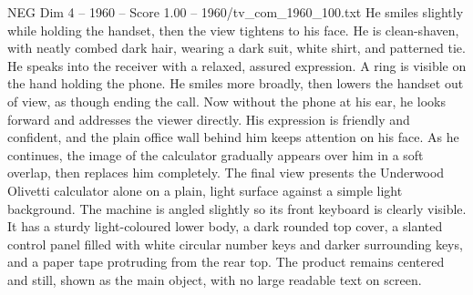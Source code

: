 \begin{textsample}{NEG Dim 4 – 1960 – Score 1.00 – 1960/tv\_com\_1960\_100.txt}
He smiles slightly while holding the handset, then the view tightens to his face.
He is clean-shaven, with neatly combed dark hair, wearing a dark suit, white shirt, and patterned tie.
He speaks into the receiver with a relaxed, assured expression.
A ring is visible on the hand holding the phone.
He smiles more broadly, then lowers the handset out of view, as though ending the call.
Now without the phone at his ear, he looks forward and addresses the viewer directly.
His expression is friendly and confident, and the plain office wall behind him keeps attention on his face.
As he continues, the image of the calculator gradually appears over him in a soft overlap, then replaces him completely.
The final view presents the Underwood Olivetti calculator alone on a plain, light surface against a simple light background.
The machine is angled slightly so its front keyboard is clearly visible.
It has a sturdy light-coloured lower body, a dark rounded top cover, a slanted control panel filled with white circular number keys and darker surrounding keys, and a paper tape protruding from the rear top.
The product remains centered and still, shown as the main object, with no large readable text on screen.

\end{textsample}
